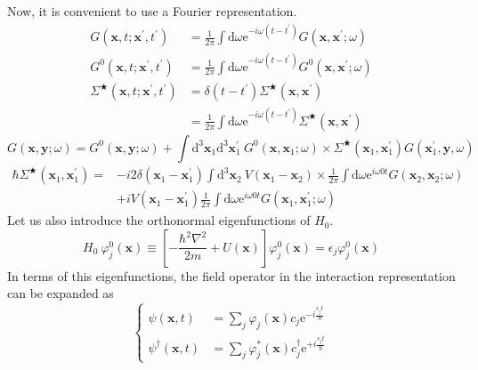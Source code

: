Now, it is convenient to use a Fourier representation.
\[ \begin{split}
G(\mathbf{x},t;\mathbf{x}^{'},t^{'})&=\frac{1}{2\pi}\int \mathrm{d} \omega \mathrm{e}^{-i \omega (t-t^{'})} G(\mathbf{x},\mathbf{x}^{'};\omega)\\
G^{0}(\mathbf{x},t;\mathbf{x}^{'},t^{'})&=\frac{1}{2\pi}\int \mathrm{d} \omega \mathrm{e}^{-i \omega (t-t^{'})} G^{0}(\mathbf{x},\mathbf{x}^{'};\omega)\\
\Sigma^{\bigstar}(\mathbf{x},t;\mathbf{x}^{'},t^{'})&=
\delta(t-t^{'})\Sigma^{\bigstar}(\mathbf{x},\mathbf{x}^{'})\\
&=\frac{1}{2\pi}\int \mathrm{d} \omega \mathrm{e}^{-i \omega (t-t^{'})}\Sigma^{\bigstar}(\mathbf{x},\mathbf{x}^{'})
\end{split} \]
\begin{equation}
G(\mathbf{x},\mathbf{y};\omega)=G^{0}(\mathbf{x},\mathbf{y};\omega)+\int \mathrm{d}^{3}\mathbf{x}_{1} \mathrm{d}^{3}\mathbf{x}^{'}_{1} \ G^{0}(\mathbf{x},\mathbf{x}_{1};\omega) \times \Sigma^{\bigstar}(\mathbf{x}_{1},\mathbf{x}^{'}_{1})G(\mathbf{x}^{'}_{1},\mathbf{y},\omega)
\label{Eqs2.6.1}\end{equation}
\begin{equation}\begin{split}
\hbar\Sigma^{\bigstar}(\mathbf{x}_{1},\mathbf{x}^{'}_{1})
=&-i 2 \delta(\mathbf{x}_{1}-\mathbf{x}^{'}_{1}) \int \mathrm{d}^{3}\mathbf{x}_{2} \ V(\mathbf{x}_{1}-\mathbf{x}_{2}) \times \frac{1}{2\pi}\int \mathrm{d} \omega \mathrm{e}^{i \omega 0 t} G(\mathbf{x}_{2},\mathbf{x}_{2};\omega)\\
&+i V(\mathbf{x}_{1}-\mathbf{x}^{'}_{1}) \frac{1}{2\pi}\int \mathrm{d} \omega \mathrm{e}^{i \omega 0 t} G(\mathbf{x}_{1},\mathbf{x}_{1}^{'};\omega)
\end{split}\label{Eqs2.6.2}\end{equation}
Let us also introduce the orthonormal eigenfunctions of $H_{0}$.
\[ H_{0} \ \varphi_{j}^{0}(\mathbf{x}) \equiv \left[ -\frac{\hbar^{2}\nabla^{2}}{2m} + U(\mathbf{x}) \right]\varphi_{j}^{0}(\mathbf{x}) = \epsilon_{j}\varphi_{j}^{0}(\mathbf{x}) \]
In terms of  this eigenfunctions, the field operator in the interaction representation can be expanded as
\[ \left \{ \begin{aligned}
\psi(\mathbf{x},t) &= \sum_{j} \varphi_{j}(\mathbf{x})c_{j}\mathrm{e}^{-i\frac{\epsilon_{j}t}{\hbar}}\\
\psi^{\dagger}(\mathbf{x},t) &= \sum_{j} \varphi^{*}_{j}(\mathbf{x})c_{j}^{\dagger}\mathrm{e}^{+i\frac{\epsilon_{j}t}{\hbar}}
\end{aligned} \right. \]
